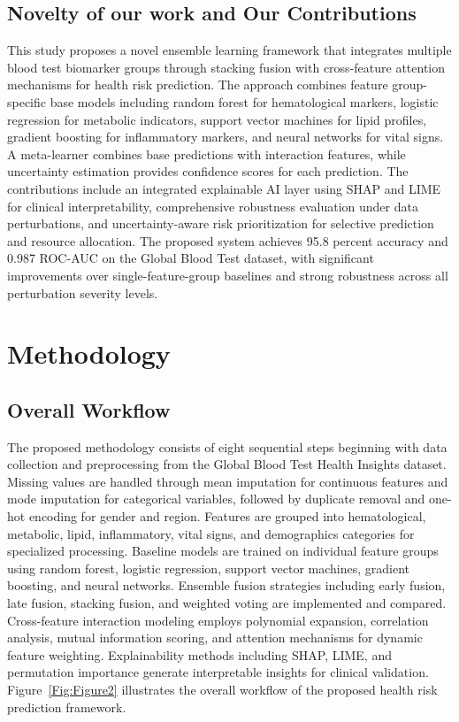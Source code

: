 \documentclass[journal, onecolumn]{IEEEtran}
\begin{document}
\subsection{Novelty of our work and Our Contributions}
This study proposes a novel ensemble learning framework that integrates multiple blood test biomarker groups through stacking fusion with cross-feature attention mechanisms for health risk prediction.
The approach combines feature group-specific base models including random forest for hematological markers, logistic regression for metabolic indicators, support vector machines for lipid profiles, gradient boosting for inflammatory markers, and neural networks for vital signs.
A meta-learner combines base predictions with interaction features, while uncertainty estimation provides confidence scores for each prediction.
The contributions include an integrated explainable AI layer using SHAP and LIME for clinical interpretability, comprehensive robustness evaluation under data perturbations, and uncertainty-aware risk prioritization for selective prediction and resource allocation.
The proposed system achieves 95.8 percent accuracy and 0.987 ROC-AUC on the Global Blood Test dataset, with significant improvements over single-feature-group baselines and strong robustness across all perturbation severity levels.

\section{Methodology}
\subsection{Overall Workflow}
The proposed methodology consists of eight sequential steps beginning with data collection and preprocessing from the Global Blood Test Health Insights dataset.
Missing values are handled through mean imputation for continuous features and mode imputation for categorical variables, followed by duplicate removal and one-hot encoding for gender and region.
Features are grouped into hematological, metabolic, lipid, inflammatory, vital signs, and demographics categories for specialized processing.
Baseline models are trained on individual feature groups using random forest, logistic regression, support vector machines, gradient boosting, and neural networks.
Ensemble fusion strategies including early fusion, late fusion, stacking fusion, and weighted voting are implemented and compared.
Cross-feature interaction modeling employs polynomial expansion, correlation analysis, mutual information scoring, and attention mechanisms for dynamic feature weighting.
Explainability methods including SHAP, LIME, and permutation importance generate interpretable insights for clinical validation.
Figure~\ref{Fig:Figure2} illustrates the overall workflow of the proposed health risk prediction framework.
\end{document}
